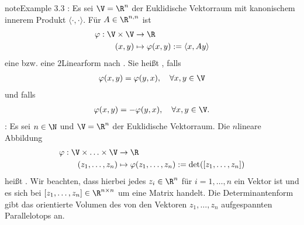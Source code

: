 \documentclass[letterpaper,10pt,english]{jupyterBook}
\begin{document}
\begin{sphinxadmonition}{note}{Example 3.3}
\sphinxAtStartPar
{}: Es sei \(\V=\R^n\) der Euklidische Vektorraum mit kanonischem innerem Produkt \(\langle\cdot,\cdot\rangle\).
Für \(A\in\R^{n,n}\) ist
\begin{equation*}
\begin{split}\varphi:\V\times \V &\to\R\\ 
(x,y) &\mapsto \varphi(x, y) :=\langle x,A y \rangle\end{split}
\end{equation*}
\sphinxAtStartPar
eine  bzw. eine \(2\)\sphinxhyphen{}Linearform nach {\hyperref[\detokenize{vektoranalysis/multilinear:def:multilinear}]{}}.
Sie heißt , falls
\begin{equation*}
\begin{split}\varphi(x, y) = \varphi(y, x), \quad \forall x, y\in \V\end{split}
\end{equation*}
\sphinxAtStartPar
und  falls
\begin{equation*}
\begin{split}\varphi(x, y) = -\varphi(y, x), \quad \forall x, y\in \V.\end{split}
\end{equation*}
\sphinxAtStartPar
{}: Es sei \(n\in \N\) und \(\V=\R^n\) der Euklidische Vektorraum.
Die \(n\)\sphinxhyphen{}lineare Abbildung
\begin{equation*}
\begin{split}\varphi :\V \times \ldots \times \V &\to\R\\ 
(z_1, \ldots, z_n) &\mapsto \varphi(z_1,\ldots,z_n) := \det([z_1,\ldots,z_n])\end{split}
\end{equation*}
\sphinxAtStartPar
heißt .
Wir beachten, dass hierbei jedes \(z_i \in \R^n\) für \(i=1,\ldots,n\) ein Vektor ist und es sich bei \([z_1,\ldots,z_n] \in \R^{n\times n}\) um eine Matrix handelt.
Die Determinantenform gibt das orientierte Volumen des von den Vektoren \(z_1,\ldots,z_n\) aufgespannten Parallelotops an.
\end{sphinxadmonition}
\end{document}
